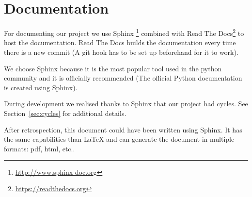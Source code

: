 \section{Documentation}\label{sec:documentation}

For documenting our project we use Sphinx%
\footnote{\url{http://www.sphinx-doc.org}} combined with Read
The Docs\footnote{\url{https://readthedocs.org}} to host the
documentation. Read The Docs builds the documentation every time there is a new
commit (A git hook has to be set up beforehand for it to work).

We choose Sphinx because it is the most popular tool used in the python
community and it is officially recommended (The official Python documentation is
created using Sphinx).

During development we realised thanks to Sphinx that our project had cycles. See
Section~\ref{sec:cycles} for additional details.

After retrospection, this document could have been written using Sphinx. It has
the same capabilities than \LaTeX{} and can generate the document in multiple
formats: pdf, html, etc..
